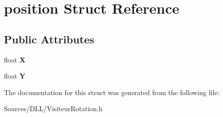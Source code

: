 \hypertarget{structposition}{}\section{position Struct Reference}
\label{structposition}
\subsection*{Public Attributes}
\begin{DoxyCompactItemize}
\item 
\hypertarget{structposition_a216a393164d184a43ac6951f03aa81de}{}\label{structposition_a216a393164d184a43ac6951f03aa81de} 
float {\bfseries X}
\item 
\hypertarget{structposition_a357b87e4e84ff9f209f164cacbf8beae}{}\label{structposition_a357b87e4e84ff9f209f164cacbf8beae} 
float {\bfseries Y}
\end{DoxyCompactItemize}


The documentation for this struct was generated from the following file\+:\begin{DoxyCompactItemize}
\item 
Sources/\+D\+L\+L/Visiteur\+Rotation.\+h\end{DoxyCompactItemize}
